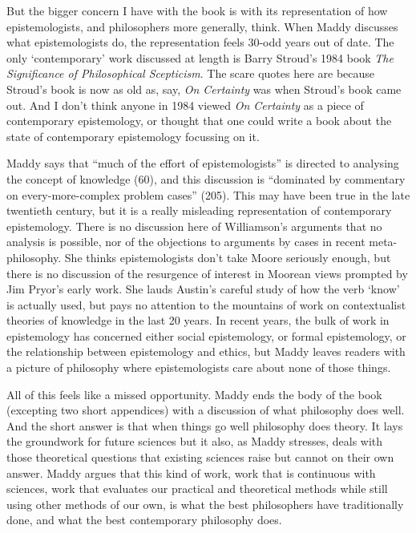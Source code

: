 \documentclass[
  11pt,
  letterpaper,
  DIV=11,
  numbers=noendperiod,
  twoside]{scrartcl}
\begin{document}
But the bigger concern I have with the book is with its representation
of how epistemologists, and philosophers more generally, think. When
Maddy discusses what epistemologists do, the representation feels 30-odd
years out of date. The only `contemporary' work discussed at length is
Barry Stroud's 1984 book \emph{The Significance of Philosophical
Scepticism}. The scare quotes here are because Stroud's book is now as
old as, say, \emph{On Certainty} was when Stroud's book came out. And I
don't think anyone in 1984 viewed \emph{On Certainty} as a piece of
contemporary epistemology, or thought that one could write a book about
the state of contemporary epistemology focussing on it.

Maddy says that ``much of the effort of epistemologists'' is directed to
analysing the concept of knowledge (60), and this discussion is
``dominated by commentary on every-more-complex problem cases'' (205).
This may have been true in the late twentieth century, but it is a
really misleading representation of contemporary epistemology. There is
no discussion here of Williamson's arguments that no analysis is
possible, nor of the objections to arguments by cases in recent
meta-philosophy. She thinks epistemologists don't take Moore seriously
enough, but there is no discussion of the resurgence of interest in
Moorean views prompted by Jim Pryor's early work. She lauds Austin's
careful study of how the verb `know' is actually used, but pays no
attention to the mountains of work on contextualist theories of
knowledge in the last 20 years. In recent years, the bulk of work in
epistemology has concerned either social epistemology, or formal
epistemology, or the relationship between epistemology and ethics, but
Maddy leaves readers with a picture of philosophy where epistemologists
care about none of those things.

All of this feels like a missed opportunity. Maddy ends the body of the
book (excepting two short appendices) with a discussion of what
philosophy does well. And the short answer is that when things go well
philosophy does theory. It lays the groundwork for future sciences but
it also, as Maddy stresses, deals with those theoretical questions that
existing sciences raise but cannot on their own answer. Maddy argues
that this kind of work, work that is continuous with sciences, work that
evaluates our practical and theoretical methods while still using other
methods of our own, is what the best philosophers have traditionally
done, and what the best contemporary philosophy does.
\end{document}
